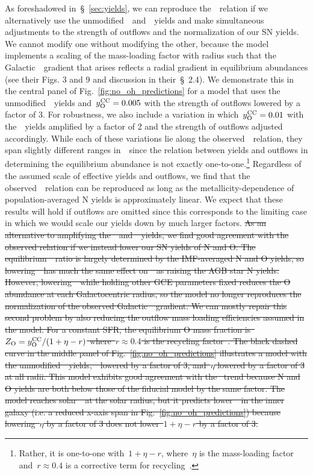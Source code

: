 \documentclass[ms.tex]{subfiles}
\begin{document}
{\color{red}
As foreshadowed in~\S~\ref{sec:yields}, we can reproduce the~\ohno~relation if
we alternatively use the unmodified~\cristallo~and~\ventura~yields and make
simultaneous adjustments to the strength of outflows and the normalization of
our SN yields.
We cannot modify one without modifying the other, because the
\citet{Johnson2021} model implements a scaling of the mass-loading factor with
radius such that the Galactic~\oh~gradient that arises reflects a radial
gradient in equilibrium abundances (see their Figs. 3 and 9 and discussion in
their~\S~2.4).
We demonstrate this in the central panel of Fig.~\ref{fig:no_oh_predictions}
for a model that uses the unmodified~\cristallo~yields and~$y_\text{O}^\text{CC} = 0.005$
with the strength of outflows lowered by a factor of 3.
For robustness, we also include a variation in which~$y_\text{O}^\text{CC} = 0.01$ with
the~\cristallo~yields amplified by a factor of 2 and the strength of outflows
adjusted accordingly.
While each of these variations lie along the observed~\ohno~relation, they span
slightly different ranges in~\oh~since the relation between yields and outflows
in determining the equilibrium abundance is not exactly one-to-one.\footnote{
	\color{red}
	Rather, it is one-to-one with~$1 + \eta - r$, where~$\eta$ is the
	mass-loading factor and~$r \approx 0.4$ is a corrective term for
	recycling~\citep{Weinberg2017}.
}
Regardless of the assumed scale of effective yields and outflows, we find that
the observed~\ohno~relation can be reproduced as long as the
metallicity-dependence of population-averaged N yields is approximately linear.
We expect that these results will hold if outflows are omitted since this
corresponds to the limiting case in which we would scale our yields down by
much larger factors.
\sout{
As an alternative to amplifying the~\cristallo~and~\ventura~yields, we find
good agreement with the observed relation if we instead lower our SN yields
of N and O.
The equilibrium~\no~ratio is largely determined by the IMF-averaged N and O
yields, so lowering~~has much the same effect on~\no~as raising the AGB
star N yields.
However, lowering~~while holding other GCE parameters fixed reduces the
O abundance at each Galactocentric radius, so the model no longer reproduces
the normalization of the observed Galactic~\oh~gradient.
We can mostly repair this second problem by also reducing the outflow mass
loading efficiencies assumed in the model.
For a constant SFR, the equilibrium O mass fraction
is~$Z_\text{O} = y_\text{O}^\text{CC}/(1 + \eta - r)$ where~$r \approx 0.4$ is the recycling
factor~\mbox{\citep{Weinberg2017}}.
The black dashed curve in the middle panel of Fig.~\ref{fig:no_oh_predictions}
illustrates a model with the unmodified~\cristallo~yields,~~lowered by a
factor of 3, and~$\eta$ lowered by a factor of 3 at all radii.
This model exhibits good agreement with the~\mbox{\citet{Dopita2016}} trend
because N
and O yields are both below those of the fiducial model by the same factor.
The model reaches solar~\oh~at the solar radius, but it predicts lower~\oh~in
the inner galaxy (i.e. a reduced x-axis span in
Fig.~\ref{fig:no_oh_predictions}) because lowering~$\eta$ by a factor of 3 does
not lower~$1 + \eta - r$ by a factor of 3.
}
}
\end{document}
